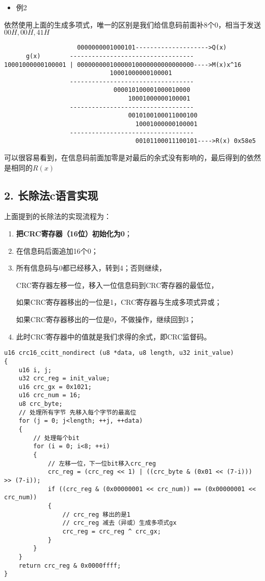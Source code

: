 \documentclass[
]{article}
\begin{document}
\begin{itemize}
\item
  例2
\end{itemize}

依然使用上面的生成多项式，唯一的区别是我们给信息码前面补8个0，相当于发送$00H,00H,41H$

\begin{verbatim}
                    0000000001000101-------------------->Q(x)
      g(x)        ----------------------------------
10001000000100001 | 00000000010000010000000000000000---->M(x)x^16
                             10001000000100001
                  ----------------------------------
                              000010100001000010000
                                  10001000000100001
                  ----------------------------------
                                  0010100100011000100
                                    10001000000100001
                  ----------------------------------
                                    00101100011100101---->R(x) 0x58e5
\end{verbatim}

可以很容易看到，在信息码前面加零是对最后的余式没有影响的，最后得到的依然是相同的$R(x)$

\newpage
\hypertarget{header-n109}{%
\subsection{2. 长除法c语言实现}\label{header-n109}}

上面提到的长除法的实现流程为：

\begin{enumerate}
\def\labelenumi{\arabic{enumi}.}
\item
  \textbf{把CRC寄存器（16位）初始化为0}；
\item
  在信息码后面追加16个0；
\item
  所有信息码与0都已经移入，转到4；否则继续，

  CRC寄存器左移一位，移入一位信息码到CRC寄存器的最低位，

  如果CRC寄存器移出的一位是1，CRC寄存器与生成多项式异或；

  如果CRC寄存器移出的一位是0，不做操作，继续回到3；
\item
  此时CRC寄存器中的值就是我们求得的余式，即CRC监督码。
\end{enumerate}

\begin{lstlisting}[style={c-style}]
u16 crc16_ccitt_nondirect (u8 *data, u8 length, u32 init_value)
{
    u16 i, j;
    u32 crc_reg = init_value;
    u16 crc_gx = 0x1021;
    u16 crc_num = 16;
    u8 crc_byte;
    // 处理所有字节 先移入每个字节的最高位
    for (j = 0; j<length; ++j, ++data)
    {
        // 处理每个bit
        for (i = 0; i<8; ++i)
        {
            // 左移一位，下一位bit移入crc_reg
            crc_reg = (crc_reg << 1) | ((crc_byte & (0x01 << (7-i))) >> (7-i));
            if ((crc_reg & (0x00000001 << crc_num)) == (0x00000001 << crc_num))
            {
                // crc_reg 移出的是1
                // crc_reg 减去（异或）生成多项式gx
                crc_reg = crc_reg ^ crc_gx;
            }
        }
    }
    return crc_reg & 0x0000ffff; 
}
\end{lstlisting}
\end{document}
